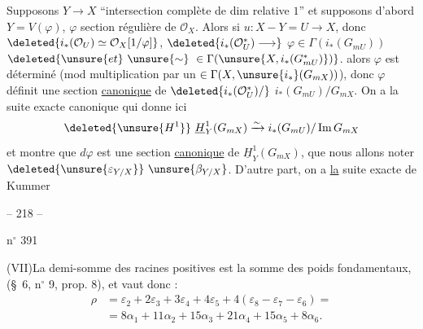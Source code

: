 Supposons $Y\longrightarrow X$ ``intersection complète de
dim relative $1$'' et supposons d'abord
$Y=V(\varphi)$, $\varphi$ section régulière de $\mathcal O_X$. Alors
si $u:X-Y=U\longrightarrow X$, donc
$\deleted{i_*(\mathcal O_U)\simeq\mathcal O_X[1/\varphi]}$,
$\deleted{i_*(\mathcal O_U^*)\longrightarrow}$
$\varphi\in\Gamma(i_*(G_{mU}))$
$\deleted{\unsure{et}\ \unsure{\sim}\ \in\Gamma(\unsure{X,i_*(G_{mU}^*)})}$.
 alors $\varphi$ est déterminé 
(mod multiplication
par un $\in\Gamma(X,\unsure{i_*}(G_{mX}))$), donc  $\varphi$ définit
une section \deleted{$\varphi\in$} \uline{canonique} de
$\deleted{i_*(\mathcal O_U^*)/}$
$i_*(G_{mU})/G_{mX}$. On a la suite exacte
canonique
qui donne ici
\[
\deleted{\unsure{H^1}}\ \underline H_Y^1(G_{mX})
\xrightarrow{\sim}i_*(G_{mU})/\operatorname{Im}G_{mX}
\]
et montre que $d\varphi$ est une section
\uline{canonique} de $\underline H_Y^1(G_{mX})$, que nous allons
noter $\deleted{\unsure{\varepsilon_{Y/X}}}\ \unsure{\beta_{Y/X}}$.
D'autre part,
on a \uline{la} suite exacte de Kummer



\begin{center}-- 218 --\end{center}
\hfill n$^{\circ}$ 391

(VII)\quad La demi-somme des racines positives est la somme des poids fondamentaux,
(\S\ 6, n$^{\circ}$ 9, prop. 8), et vaut donc :
\[
\begin{aligned}
\rho&=\varepsilon_2+2\varepsilon_3+3\varepsilon_4+4\varepsilon_5+
4(\varepsilon_8-\varepsilon_7-\varepsilon_6)=\\
&=8\alpha_1+11\alpha_2+15\alpha_3+21\alpha_4+15\alpha_5+8\alpha_6.
\end{aligned}
\]

